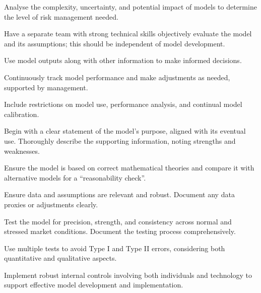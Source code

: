 \begin{lettered}
\item Analyse the complexity, uncertainty, and potential impact of models to
determine the level of risk management needed.
\item Have a separate team with strong technical skills objectively evaluate the
model and its assumptions; this should be independent of model development.
\item Use model outputs along with other information to make informed decisions.
\item Continuously track model performance and make adjustments as needed,
supported by management.
\item Include restrictions on model use, performance analysis, and continual
model calibration.
\end{lettered}



\begin{lettered}
\item Begin with a clear statement of the model's purpose, aligned with its
eventual use. Thoroughly describe the supporting information, noting strengths
and weaknesses.
\item Ensure the model is based on correct mathematical theories and compare it
with alternative models for a ``reasonability check''.
\item Ensure data and assumptions are relevant and robust. Document any data
proxies or adjustments clearly.
\item Test the model for precision, strength, and consistency across normal and
stressed market conditions. Document the testing process comprehensively.
\item Use multiple tests to avoid Type I and Type II errors, considering both
quantitative and qualitative aspects.
\item Implement robust internal controls involving both individuals and
technology to support effective model development and implementation.
\end{lettered}


